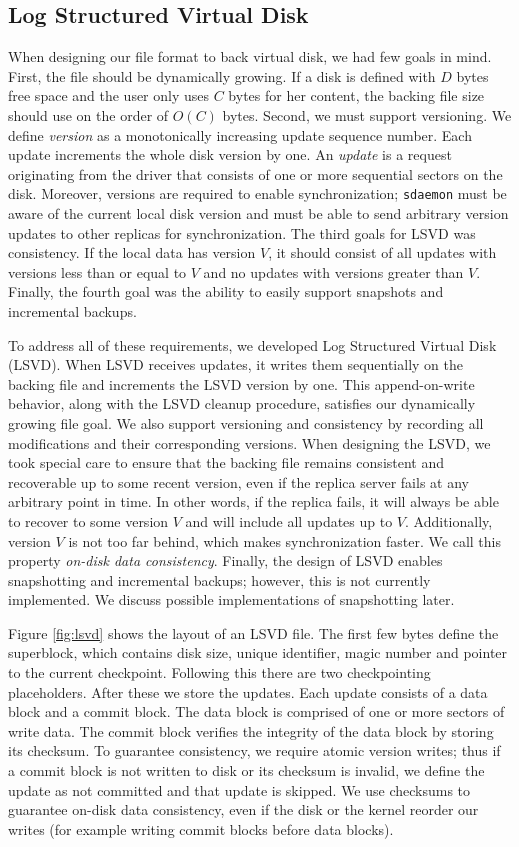 \subsection{Log Structured Virtual Disk}
\label{sec:lsvd}

When designing our file format to back virtual disk, we had few goals in mind. First, the file should be dynamically growing. If a disk is defined with $D$ bytes free space and the user only uses $C$ bytes for her content, the backing file size should use on the order of $O(C)$ bytes. Second, we must support versioning. We define \emph{version} as a monotonically increasing update sequence number. Each update increments the whole disk version by one. An \emph{update} is a request originating from the driver that consists of one or more sequential sectors on the disk. Moreover, versions are required to enable synchronization; \texttt{sdaemon} must be aware of the current local disk version and must be able to send arbitrary version updates to other replicas for synchronization. The third goals for LSVD was consistency. If the local data has version $V$, it should consist of all updates with versions less than or equal to $V$ and no updates with versions greater than $V$. Finally, the fourth goal was the ability to easily support snapshots and incremental backups.

To address all of these requirements, we developed Log Structured Virtual Disk (LSVD). When LSVD receives updates, it writes them sequentially on the backing file and increments the LSVD version by one. This append-on-write behavior, along with the LSVD cleanup procedure, satisfies our dynamically growing file goal. We also support versioning and consistency by recording all modifications and their corresponding versions. When designing the LSVD, we took special care to ensure that the backing file remains consistent and recoverable up to some recent version, even if the replica server fails at any arbitrary point in time. In other words, if the replica fails, it will always be able to recover to some version $V$ and will include all updates up to $V$. Additionally, version $V$ is not too far behind, which makes synchronization faster. We call this property \emph{on-disk data consistency}. Finally, the design of LSVD enables snapshotting and incremental backups; however, this is not currently implemented. We discuss possible implementations of snapshotting later.

Figure \ref{fig:lsvd} shows the layout of an LSVD file. The first few bytes define the superblock, which contains disk size, unique identifier, magic number and pointer to the current checkpoint. Following this there are two checkpointing placeholders. After these we store the updates. Each update consists of a data block and a commit block. The data block is comprised of one or more sectors of write data. The commit block verifies the integrity of the data block by storing its checksum. To guarantee consistency, we require atomic version writes; thus if a commit block is not written to disk or its checksum is invalid, we define the update as not committed and that update is skipped. We use checksums to guarantee on-disk data consistency, even if the disk or the kernel reorder our writes (for example writing commit blocks before data blocks).

